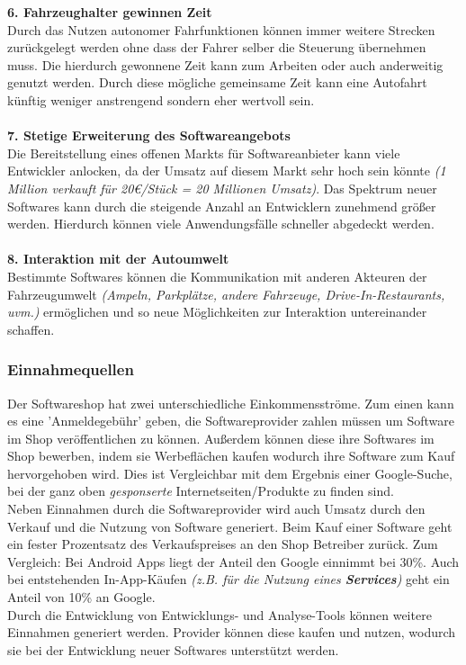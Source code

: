 \textbf{6. Fahrzeughalter gewinnen Zeit}\\
Durch das Nutzen autonomer Fahrfunktionen können immer weitere Strecken zurückgelegt werden ohne dass der Fahrer selber die Steuerung übernehmen muss. Die hierdurch gewonnene Zeit kann zum Arbeiten oder auch anderweitig genutzt werden. Durch diese mögliche gemeinsame Zeit kann eine Autofahrt künftig weniger anstrengend sondern eher wertvoll sein.\\\\
\textbf{7. Stetige Erweiterung des Softwareangebots}\\
Die Bereitstellung eines offenen Markts für Softwareanbieter kann viele Entwickler anlocken, da der Umsatz auf diesem Markt sehr hoch sein könnte \textit{(1 Million verkauft für 20€/Stück = 20 Millionen Umsatz)}. Das Spektrum neuer Softwares kann durch die steigende Anzahl an Entwicklern zunehmend größer werden. Hierdurch können viele Anwendungsfälle schneller abgedeckt werden.\\\\
\textbf{8. Interaktion mit der Autoumwelt}\\
Bestimmte Softwares können die Kommunikation mit anderen Akteuren der Fahrzeugumwelt \textit{(Ampeln, Parkplätze, andere Fahrzeuge, Drive-In-Restaurants, uvm.)} ermöglichen und so neue Möglichkeiten zur Interaktion untereinander schaffen.

\subsubsection{Einnahmequellen}
Der Softwareshop hat zwei unterschiedliche Einkommensströme. Zum einen kann es eine 'Anmeldegebühr' geben, die Softwareprovider zahlen müssen um Software im Shop veröffentlichen zu können. Außerdem können diese ihre Softwares im Shop bewerben, indem sie Werbeflächen kaufen wodurch ihre Software zum Kauf hervorgehoben wird. Dies ist Vergleichbar mit dem Ergebnis einer Google-Suche, bei der ganz oben \textit{gesponserte} Internetseiten/Produkte zu finden sind.\\
Neben Einnahmen durch die Softwareprovider wird auch Umsatz durch den Verkauf und die Nutzung von Software generiert. Beim Kauf einer Software geht ein fester Prozentsatz des Verkaufspreises an den Shop Betreiber zurück. Zum Vergleich: Bei Android Apps liegt der Anteil den Google einnimmt bei 30\%. Auch bei entstehenden In-App-Käufen \textit{(z.B. für die Nutzung eines \textbf{Services})} geht ein Anteil von 10\% an Google.\\
Durch die Entwicklung von Entwicklungs- und Analyse-Tools können weitere Einnahmen generiert werden. Provider können diese kaufen und nutzen, wodurch sie bei der Entwicklung neuer Softwares unterstützt werden.


